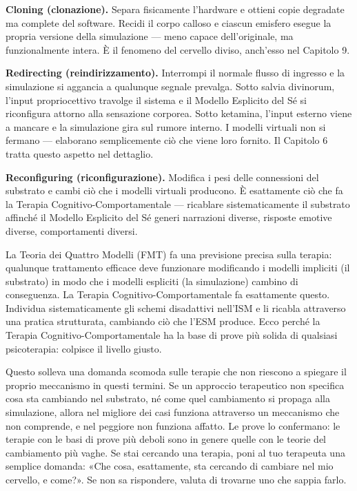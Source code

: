 \documentclass[11pt, twoside, openright]{book}
\begin{document}
\textbf{Cloning (clonazione).} Separa fisicamente l'hardware e ottieni copie degradate ma complete del software. Recidi il corpo calloso e ciascun emisfero esegue la propria versione della simulazione --- meno capace dell'originale, ma funzionalmente intera. È il fenomeno del cervello diviso, anch'esso nel Capitolo 9.

\textbf{Redirecting (reindirizzamento).} Interrompi il normale flusso di ingresso e la simulazione si aggancia a qualunque segnale prevalga. Sotto salvia divinorum, l'input propriocettivo travolge il sistema e il Modello Esplicito del Sé si riconfigura attorno alla sensazione corporea. Sotto ketamina, l'input esterno viene a mancare e la simulazione gira sul rumore interno. I modelli virtuali non si fermano --- elaborano semplicemente ciò che viene loro fornito. Il Capitolo 6 tratta questo aspetto nel dettaglio.

\textbf{Reconfiguring (riconfigurazione).} Modifica i pesi delle connessioni del substrato e cambi ciò che i modelli virtuali producono. È esattamente ciò che fa la Terapia Cognitivo-Comportamentale --- ricablare sistematicamente il substrato affinché il Modello Esplicito del Sé generi narrazioni diverse, risposte emotive diverse, comportamenti diversi.

La Teoria dei Quattro Modelli (FMT) fa una previsione precisa sulla terapia: qualunque trattamento efficace deve funzionare modificando i modelli impliciti (il substrato) in modo che i modelli espliciti (la simulazione) cambino di conseguenza. La Terapia Cognitivo-Comportamentale fa esattamente questo. Individua sistematicamente gli schemi disadattivi nell'ISM e li ricabla attraverso una pratica strutturata, cambiando ciò che l'ESM produce. Ecco perché la Terapia Cognitivo-Comportamentale ha la base di prove più solida di qualsiasi psicoterapia: colpisce il livello giusto.

Questo solleva una domanda scomoda sulle terapie che non riescono a spiegare il proprio meccanismo in questi termini. Se un approccio terapeutico non specifica cosa sta cambiando nel substrato, né come quel cambiamento si propaga alla simulazione, allora nel migliore dei casi funziona attraverso un meccanismo che non comprende, e nel peggiore non funziona affatto. Le prove lo confermano: le terapie con le basi di prove più deboli sono in genere quelle con le teorie del cambiamento più vaghe. Se stai cercando una terapia, poni al tuo terapeuta una semplice domanda: «Che cosa, esattamente, sta cercando di cambiare nel mio cervello, e come?». Se non sa rispondere, valuta di trovarne uno che sappia farlo.
\end{document}
